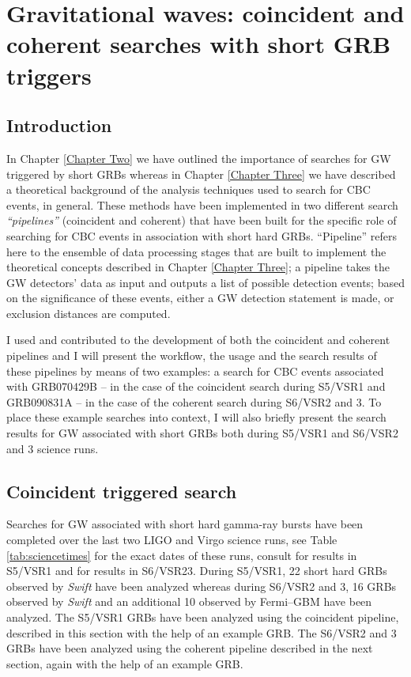 \chapter{Gravitational waves: coincident and coherent searches with short GRB triggers} %
\label{Chapter Four}

\section{Introduction}
In Chapter \ref{Chapter Two} we have outlined the importance of searches for GW triggered by short GRBs whereas in Chapter \ref{Chapter Three} we have described a theoretical background of the analysis techniques used to search for CBC events, in general. These methods have been implemented in two different search \emph{``pipelines''} (coincident and coherent) that have been built for the specific role of searching for CBC events in association with short hard GRBs. ``Pipeline'' refers here to the ensemble of data processing stages that are built to implement the theoretical concepts described in Chapter \ref{Chapter Three}; a pipeline takes the GW detectors' data as input and outputs a list of possible detection events; based on the significance of these events, either a GW detection statement is made, or exclusion distances are computed. 

I used and contributed to the development of both the coincident and coherent pipelines and I will present the workflow, the usage and the search results of these pipelines by means of two examples: a search for CBC events associated with GRB070429B -- in the case of the coincident search during S5/VSR1 and GRB090831A -- in the case of the coherent search during S6/VSR2 and 3. To place these example searches into context, I will also briefly present the search results for GW associated with short GRBs both during S5/VSR1 and S6/VSR2 and 3 science runs.

\section{Coincident triggered search}
\label{coincident_GRB}

Searches for GW associated with short hard gamma-ray bursts have been completed over the last two LIGO and Virgo science runs, see Table \ref{tab:sciencetimes} for the exact dates of these runs, consult \cite{Abadie:2010uf} for results in S5/VSR1 and \cite{lvc:s6grb} for results in S6/VSR23. During S5/VSR1, 22 short hard GRBs observed by \emph{Swift} have been analyzed whereas during S6/VSR2 and 3, 16 GRBs observed by \emph{Swift} and an additional 10 observed by Fermi--GBM have been analyzed. The S5/VSR1 GRBs have been analyzed using the coincident pipeline, described in this section with the help of an example GRB. The S6/VSR2 and 3 GRBs have been analyzed using the coherent pipeline described in the next section, again with the help of an example GRB.


